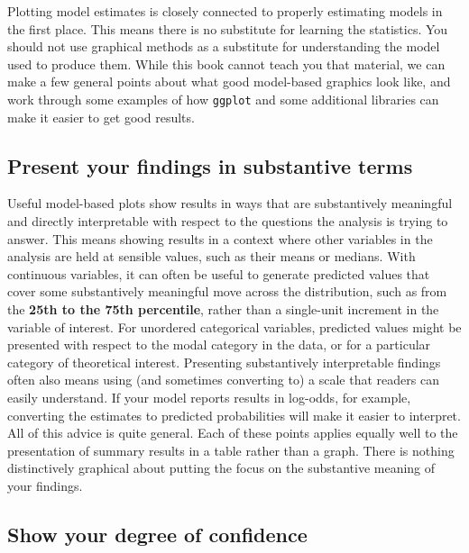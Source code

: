 \documentclass[]{book}
\begin{document}
Plotting model estimates is closely connected to properly estimating models in the first place. This means there is no substitute for learning the statistics. You should not use graphical methods as a substitute for understanding the model used to produce them. While this book cannot teach you that material, we can make a few general points about what good model-based graphics look like, and work through some examples of how \texttt{ggplot} and some additional libraries can make it easier to get good results.

\hypertarget{present-your-findings-in-substantive-terms}{%
\subsection{Present your findings in substantive terms}\label{present-your-findings-in-substantive-terms}}

Useful model-based plots show results in ways that are substantively meaningful and directly interpretable with respect to the questions the analysis is trying to answer. This means showing results in a context where other variables in the analysis are held at sensible values, such as their means or medians. With continuous variables, it can often be useful to generate predicted values that cover some substantively meaningful move across the distribution, such as from the \textbf{25th to the 75th percentile}, rather than a single-unit increment in the variable of interest. For unordered categorical variables, predicted values might be presented with respect to the modal category in the data, or for a particular category of theoretical interest. Presenting substantively interpretable findings often also means using (and sometimes converting to) a scale that readers can easily understand. If your model reports results in log-odds, for example, converting the estimates to predicted probabilities will make it easier to interpret. All of this advice is quite general. Each of these points applies equally well to the presentation of summary results in a table rather than a graph. There is nothing distinctively graphical about putting the focus on the substantive meaning of your findings.

\hypertarget{show-your-degree-of-confidence}{%
\subsection{Show your degree of confidence}\label{show-your-degree-of-confidence}}
\end{document}
